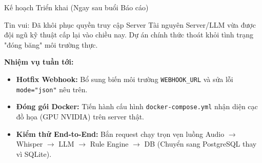\begin{frame}{Kế hoạch Triển khai (Ngay sau buổi Báo cáo)}
    \begin{exampleblock}{Tin vui: Đã khôi phục quyền truy cập Server}
        Tài nguyên Server/LLM vừa được đội ngũ kỹ thuật cấp lại vào chiều nay. Dự án chính thức thoát khỏi tình trạng "đóng băng" môi trường thực.
    \end{exampleblock}
    
    \vspace{0.2cm}
    \textbf{Nhiệm vụ tuần tới:}
    \begin{itemize}
        \item \textbf{Hotfix Webhook:} Bổ sung biến môi trường \texttt{WEBHOOK\_URL} và sửa lỗi \texttt{mode="json"} nêu trên.
        \item \textbf{Đóng gói Docker:} Tiến hành cấu hình \texttt{docker-compose.yml} nhận diện cạc đồ họa (GPU NVIDIA) trên server thật.
        \item \textbf{Kiểm thử End-to-End:} Bắn request chạy trọn vẹn luồng Audio $\rightarrow$ Whisper $\rightarrow$ LLM $\rightarrow$ Rule Engine $\rightarrow$ DB (Chuyển sang PostgreSQL thay vì SQLite).
    \end{itemize}
\end{frame}
